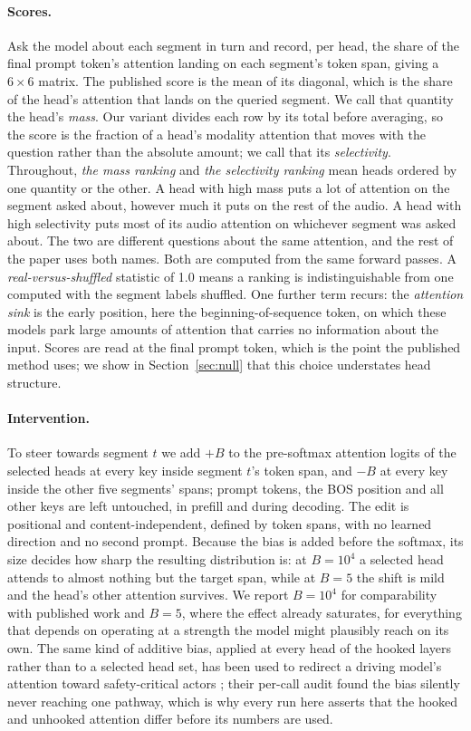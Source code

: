 \documentclass[11pt]{article}
\begin{document}
\paragraph{Scores.} Ask the model about each segment in turn and record, per head,
the share of the final prompt token's attention landing on each segment's token
span, giving a $6\times6$ matrix. The published score is the mean of its diagonal, which
is the share of the head's attention that lands on the queried segment. We call
that quantity the head's \emph{mass}. Our variant divides each row by its total
before averaging, so the score is the fraction of a head's modality attention
that moves with the question rather than the absolute amount; we call that its
\emph{selectivity}. Throughout, \emph{the mass ranking} and \emph{the
selectivity ranking} mean heads ordered by one quantity or the other. A head with
high mass puts a lot of attention on the segment asked about, however much it puts
on the rest of the audio. A head with high selectivity puts most of its audio
attention on whichever segment was asked about. The two are
different questions about the same attention, and the rest of the paper uses both
names. Both are computed from the same forward passes. A
\emph{real-versus-shuffled} statistic of 1.0 means a ranking is indistinguishable
from one computed with the segment labels shuffled. One further term recurs: the
\emph{attention sink} is the early position, here the beginning-of-sequence
token, on which these models park large amounts of attention that carries no
information about the input. Scores are read at the final prompt token, which is
the point the published method uses; we show in Section~\ref{sec:null} that this
choice understates head structure.

\paragraph{Intervention.} To steer towards segment $t$ we add $+B$ to the
pre-softmax attention logits of the selected heads at every key inside segment
$t$'s token span, and $-B$ at every key inside the other five segments' spans;
prompt tokens, the BOS position and all other keys are left untouched, in prefill
and during decoding. The edit is positional and content-independent, defined
by token spans, with no learned direction and no second prompt. Because the bias is added before the softmax, its size decides how sharp the
resulting distribution is: at $B{=}10^4$ a selected head attends to almost
nothing but the target span, while at $B{=}5$ the shift is mild and the head's
other attention survives. We report $B{=}10^4$ for comparability with published
work and $B{=}5$, where the effect already saturates, for everything that depends
on operating at a strength the model might plausibly reach on its own. The same
kind of additive bias, applied at every head of the hooked layers rather than to
a selected head set, has been used to redirect a driving model's attention toward
safety-critical actors \citep{prasad2026steering}; their per-call audit found the
bias silently never reaching one pathway, which is why every run here asserts that the hooked and
unhooked attention differ before its numbers are used.
\end{document}
